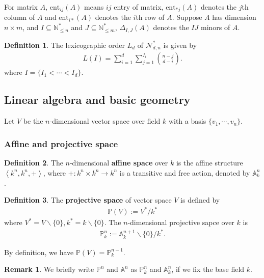 \documentclass[10pt,UTF8]{article}
\theoremstyle{definition}
\newtheorem{definition}{Definition}[section]
\newtheorem*{remark}{Remark}
\begin{document}
For matrix $A$, $\text{ent}_{ij}(A)$ means $ij$ entry of matrix, $\text{ent}_{* j}(A)$ denotes the $j$th column of $A$ and 
$\text{ent}_{i*}(A)$ denotes the $i$th row of $A$. Suppose $A$ has dimension $n\times m$, and $I\subseteq \mathbb{N}^*_{\le n}$ and $J\subseteq \mathbb{N}^*_{\le m}$, $\Delta_{I,J}(A)$ denotes the $IJ$ minors of $A$.
 
\begin{definition}
  The lexicographic order $L_d$ of $\mathcal{N}^*_{d,n}$ is given by
\begin{align*}
  L(I) = \sum_{i=1}^d \sum_{j=1}^{I_i}\binom{n-j}{d-i}.
\end{align*}
where $I=\{I_1<\cdots<I_d\}$.
\end{definition}



\subsection{Linear algebra and basic geometry}

Let $V$ be the $n$-dimensional vector space over field $k$ with a basis $\{v_1,\cdots,v_n\}$.






\subsubsection{Affine and projective space}
\begin{definition}
  The $n$-dimensional \textbf{affine space} over $k$ is the affine structure $\left\langle k^n,k^n,+ \right\rangle$, where $+:k^n\times k^n\to k^n$ is a transitive and free action, denoted by $\mathbb{A}^n_k$.
\end{definition}



\begin{definition}
  The \textbf{projective space} of vector space $V$ is defined by 
  \begin{align*}
    \mathbb{P}(V) := V^*/k^*
  \end{align*}
  where $V^*=V\backslash \{0\},k^*=k\backslash \{0\}$. The $n$-dimensional projective sapce over $k$ is 
  \begin{align*}
    \mathbb{P}^n_k := \mathbb{A}_k^{n+1}\backslash\{0\}/k^*.
  \end{align*}
\end{definition}
By definition, we have $\mathbb{P}(V)=\mathbb{P}^{n-1}_k$.
\begin{remark}
  We briefly write $\mathbb{P}^n$ and $\mathbb{A}^n$ as $\mathbb{P}_k^n$ and $\mathbb{A}_k^n$, if we fix the base field $k$.
\end{remark}
\end{document}
